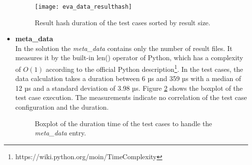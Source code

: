 \documentclass[draft,final]{vutinfth} %
\begin{document}
\begin{itemize}
	\begin{figure}[h]
		\centering
		\texttt{[image: eva\_data\_resulthash]}
		\caption{Result hash duration of the test cases sorted by result size.}
		\label{fig:evaluation_data_resulthash} %
	\end{figure}
	

	\item \textbf{meta\_data} \\
	In the solution the \textit{meta\_data} contains only the number of result files. It measures it by the built-in len() operator of Python, which has a complexity of $O(1)$ according to the official Python description\footnote{https://wiki.python.org/moin/TimeComplexity}. In the test cases, the data calculation takes a duration between 6 µs and 359 µs with a median of 12 µs and a standard deviation of 3.98 µs. Figure \ref{fig:evaluation_perf_meta_data} shows the boxplot of the test case execution. The measurements indicate no correlation of the test case configuration and the duration.
	\begin{figure}[!h]
		\centering
		\caption{Boxplot of the duration time of the test cases to handle the \textit{meta\_data} entry.}
		\label{fig:evaluation_perf_meta_data}	
	\end{figure}
	

\end{itemize}
\end{document}
